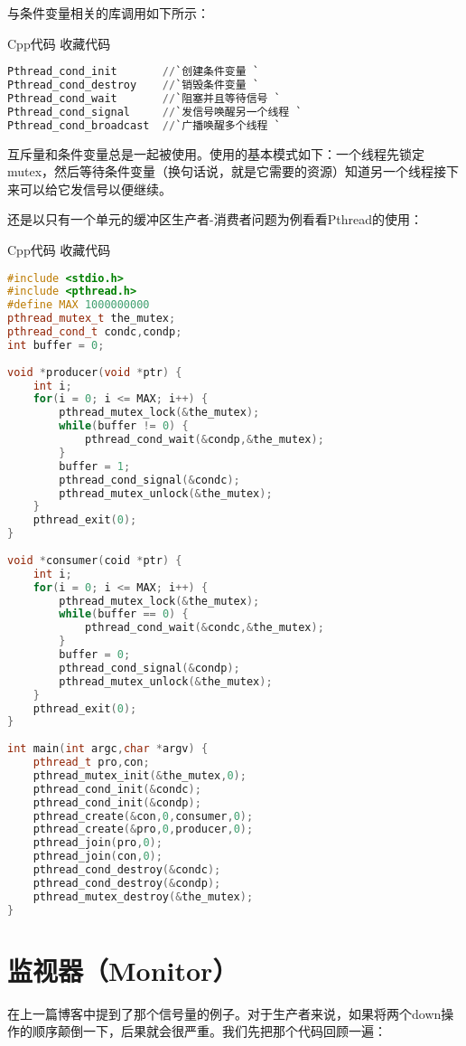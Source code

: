 \documentclass{article}
\begin{document}
\begin{CJK}{UTF8}{gbsn}
    与条件变量相关的库调用如下所示：
 
Cpp代码  收藏代码
\begin{lstlisting}[language=Python]
Pthread_cond_init       //`创建条件变量 ` 
Pthread_cond_destroy    //`销毁条件变量 ` 
Pthread_cond_wait       //`阻塞并且等待信号 ` 
Pthread_cond_signal     //`发信号唤醒另一个线程 `
Pthread_cond_broadcast  //`广播唤醒多个线程 `
\end{lstlisting}
    互斥量和条件变量总是一起被使用。使用的基本模式如下：一个线程先锁定mutex，然后等待条件变量（换句话说，就是它需要的资源）知道另一个线程接下来可以给它发信号以便继续。
 
    还是以只有一个单元的缓冲区生产者-消费者问题为例看看Pthread的使用：
 
Cpp代码  收藏代码
\begin{lstlisting}[language=c++]
#include <stdio.h>  
#include <pthread.h>  
#define MAX 1000000000  
pthread_mutex_t the_mutex;  
pthread_cond_t condc,condp;  
int buffer = 0;  
  
void *producer(void *ptr) {  
    int i;  
    for(i = 0; i <= MAX; i++) {  
        pthread_mutex_lock(&the_mutex);  
        while(buffer != 0) {  
            pthread_cond_wait(&condp,&the_mutex);  
        }  
        buffer = 1;  
        pthread_cond_signal(&condc);  
        pthread_mutex_unlock(&the_mutex);  
    }  
    pthread_exit(0);  
}  
  
void *consumer(coid *ptr) {  
    int i;  
    for(i = 0; i <= MAX; i++) {  
        pthread_mutex_lock(&the_mutex);  
        while(buffer == 0) {  
            pthread_cond_wait(&condc,&the_mutex);  
        }  
        buffer = 0;  
        pthread_cond_signal(&condp);  
        pthread_mutex_unlock(&the_mutex);  
    }  
    pthread_exit(0);  
}  
  
int main(int argc,char *argv) {  
    pthread_t pro,con;  
    pthread_mutex_init(&the_mutex,0);  
    pthread_cond_init(&condc);  
    pthread_cond_init(&condp);  
    pthread_create(&con,0,consumer,0);  
    pthread_create(&pro,0,producer,0);  
    pthread_join(pro,0);  
    pthread_join(con,0);  
    pthread_cond_destroy(&condc);  
    pthread_cond_destroy(&condp);  
    pthread_mutex_destroy(&the_mutex);  
} 
\end{lstlisting}


\section{监视器（Monitor）}
在上一篇博客中提到了那个信号量的例子。对于生产者来说，如果将两个down操作的顺序颠倒一下，后果就会很严重。我们先把那个代码回顾一遍：
 

\end{CJK}
\end{document}
